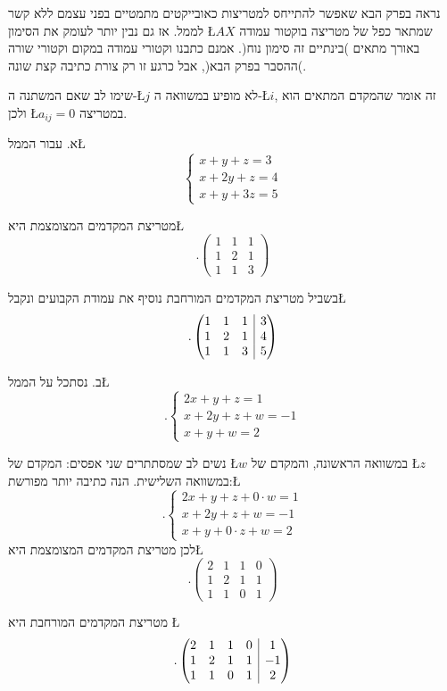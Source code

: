נראה בפרק הבא שאפשר להתייחס למטריצות כאובייקטים מתמטיים בפני עצמם
ללא קשר לממ\textquotedbl ל. אז גם נבין יותר לעומק את הסימון \L{$AX$}
שמתאר כפל של מטריצה בוקטור עמודה באורך מתאים )בינתיים זה סימון נוח(.
אמנם כתבנו וקטורי עמודה במקום וקטורי שורה )ההסבר בפרק הבא(, אבל כרגע
זו רק צורת כתיבה קצת שונה. 

\begin{remark}
שימו לב שאם המשתנה ה-\L{$j$} לא מופיע במשוואה ה-\L{$i$}, זה
אומר שהמקדם המתאים הוא {\endL} ולכן \L{$a_{ij}=0$} במטריצה.
\end{remark}

\begin{examples}
א. עבור הממ\textquotedbl ל\L{%
\[
\begin{cases}
x+y+z=3\\
x+2y+z=4\\
x+y+3z=5
\end{cases}
\]
}%

מטריצת המקדמים המצומצמת היא\L{%
\[
.\begin{pmatrix}1 & 1 & 1\\
1 & 2 & 1\\
1 & 1 & 3
\end{pmatrix}
\]
}%

בשביל מטריצת המקדמים המורחבת נוסיף את עמודת הקבועים ונקבל\L{%
\[
.\left( \begin{array}{@{}ccc|c@{}}
1 & 1 & 1 & 3\\
1 & 2 & 1 & 4\\
1 & 1 & 3 & 5
\end{array} \right)
\]
}%

ב. נסתכל על הממ\textquotedbl ל\L{%
\[
.\begin{cases}
2x+y+z=1\\
x+2y+z+w=-1\\
x+y+w=2
\end{cases}
\]
}%

נשים לב שמסתתרים שני אפסים: המקדם של \L{$w$} במשוואה הראשונה, והמקדם
של \L{$z$} במשוואה השלישית. הנה כתיבה יותר מפורשת:\L{%
\[
.\begin{cases}
	2x+y+z+0\cdot w=1\\
	x+2y+z+w=-1\\
	x+y+0\cdot z+w=2
\end{cases}
\]
}%
לכן מטריצת המקדמים המצומצמת היא\L{%
\[
.\begin{pmatrix}2 & 1 & 1 & 0\\
1 & 2 & 1 & 1\\
1 & 1 & 0 & 1
\end{pmatrix}
\]
}%

מטריצת המקדמים המורחבת היא \L{%
\[
.\left( \begin{array}{@{}cccc|c@{}}
	2 & 1 & 1 & 0 & 1\\
	1 & 2 & 1 & 1 & -1\\
	1 & 1 & 0 & 1 & 2
\end{array} \right)
\]
}%
\end{examples}

